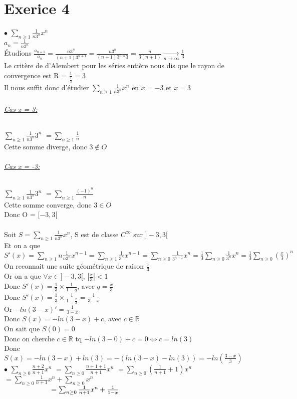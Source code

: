 \documentclass{article}
\author{Frederic Becerril}
\newcommand\tab[1][1cm]{\hspace*{#1}}
\newcommand{\mylim}[2]{\underset{#1 \rightarrow #2}{\longrightarrow}}
\begin{document}
\part*{Exerice 4}

$\bullet$ $\sum_{n\geq 1} \frac{1}{n3^n}x^n$\\
$a_n = \frac{1}{n3^n}$\\
Étudions $\frac{a_{n+1}}{a_n} = \frac{n3^n}{(n+1)3^{n+1}} = \frac{n3^n}{(n+1)3^n * 3} = \frac{n}{3(n+1)} \mylim{n}{\infty} \frac{1}{3}$\\
Le critère de d'Alembert pour les séries entière nous dis que le rayon de convergence est R = $\frac{1}{\frac{1}{3}} = 3$\\
Il nous suffit donc d'étudier $\sum_{n\geq 1} \frac{1}{n3^n}x^n$ en $x = -3$ et $x = 3$
\paragraph{\underline{Cas x = 3:}} $\sum_{n\geq 1} \frac{1}{n3^n}3^n$
$=\sum_{n\geq 1} \frac{1}{n}$\\
Cette somme diverge, donc $3 \notin O$
\paragraph{\underline{Cas x = -3:}} $\sum_{n\geq 1} \frac{1}{n3^n}3^n$
$=\sum_{n\geq 1} \frac{(-1)^n}{n}$\\
Cette somme converge, donc $3 \in O$\\
Donc O = $[-3, 3[$\\
\\
Soit $S = \sum_{n\geq 1} \frac{1}{n3^n}x^n$, S est de classe $C^\infty$ sur $]-3, 3[$\\
Et on a que $S'(x) = \sum_{n\geq 1} n\frac{1}{n3^n}x^{n - 1} = \sum_{n\geq 1} \frac{1}{3^n}x^{n - 1} = \sum_{n\geq 0} \frac{1}{3^{n+1}}x^n = \frac{1}{3} \sum_{n\geq 0} \frac{1}{3^n}x^n = \frac{1}{3} \sum_{n\geq 0} (\frac{x}{3})^n$\\
On reconnait une suite géométrique de raison $\frac{x}{3}$\\
Or on a que $\forall x \in ]-3, 3[$, $|\frac{x}{3}| < 1$\\
Donc $S'(x) = \frac{1}{3} \times \frac{1}{1-q}$, avec $q = \frac{x}{3}$\\
Donc $S'(x) = \frac{1}{3} \times \frac{1}{1 - \frac{x}{3}} = \frac{1}{3 - x}$\\
Or $-ln(3 - x)' = \frac{1}{3-x}$\\
Donc $S(x) = -ln(3 - x) + c$, avec $c \in \mathbb{R}$\\
On sait que $S(0) = 0$\\
Donc on cherche $c \in \mathbb{R}$ tq $-ln(3 - 0) + c = 0 \Leftrightarrow c = ln(3)$\\
Donc $S(x) = -ln(3 - x) + ln(3) = -(ln(3 - x) - ln(3)) = -ln(\frac{3 - x}{3})$\\

\noindent $\bullet$ $\sum_{n\geq 0} \frac{n + 2}{n + 1}x^n$
$= \sum_{n\geq 0} \frac{n + 1 + 1}{n + 1}x^n$
$= \sum_{n\geq 0} (\frac{1}{n + 1} + 1)x^n $
$= \sum_{n\geq 0} \frac{1}{n + 1}x^n  +\sum_{n\geq 0} x^n$\\
$\tab[2.35cm] = \sum_{n\geq 0} \frac{1}{n + 1}x^n  + \frac{1}{1-x}$
\end{document}
